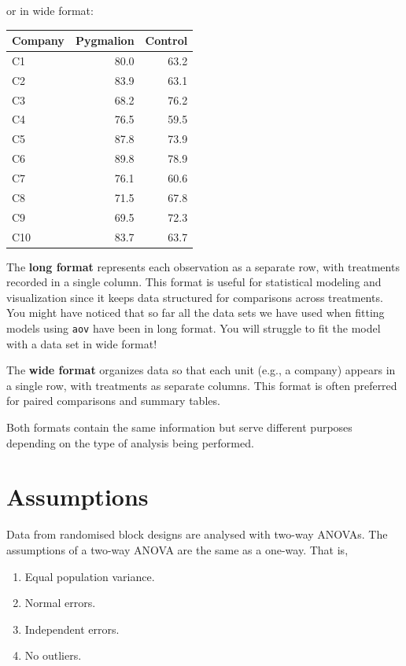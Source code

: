 \documentclass[
  letterpaper,
]{book}
\providecommand{\tightlist}{%
  \setlength{\itemsep}{0pt}\setlength{\parskip}{0pt}}\usepackage{longtable,booktabs,array}
\begin{document}
\vspace{5em}

or in wide format:

\begin{longtable*}[t]{lrr}
\toprule
Company & Pygmalion & Control\\
\midrule
C1 & 80.0 & 63.2\\
C2 & 83.9 & 63.1\\
C3 & 68.2 & 76.2\\
C4 & 76.5 & 59.5\\
C5 & 87.8 & 73.9\\
\addlinespace
C6 & 89.8 & 78.9\\
C7 & 76.1 & 60.6\\
C8 & 71.5 & 67.8\\
C9 & 69.5 & 72.3\\
C10 & 83.7 & 63.7\\
\bottomrule
\end{longtable*}

The \textbf{long format} represents each observation as a separate row,
with treatments recorded in a single column. This format is useful for
statistical modeling and visualization since it keeps data structured
for comparisons across treatments. You might have noticed that so far
all the data sets we have used when fitting models using \texttt{aov}
have been in long format. You will struggle to fit the model with a data
set in wide format!

The \textbf{wide format} organizes data so that each unit (e.g., a
company) appears in a single row, with treatments as separate columns.
This format is often preferred for paired comparisons and summary
tables.

Both formats contain the same information but serve different purposes
depending on the type of analysis being performed.

\chapter{Assumptions}\label{assumptions}

Data from randomised block designs are analysed with two-way ANOVAs. The
assumptions of a two-way ANOVA are the same as a one-way. That is,

\begin{enumerate}
\def\labelenumi{\arabic{enumi}.}
\tightlist
\item
  Equal population variance.
\item
  Normal errors.
\item
  Independent errors.
\item
  No outliers.
\end{enumerate}
\end{document}
